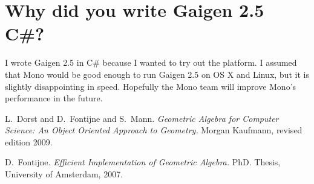 \documentclass[10pt, a4paper]{article}
\begin{document}
\section{Why did you write Gaigen 2.5 C\#?}

I wrote Gaigen 2.5 in C\# because I wanted to try out the platform.
I assumed that Mono would be good enough to run Gaigen 2.5 on OS X and
Linux, but it is slightly disappointing in speed. Hopefully the Mono
team will improve Mono's performance in the future.




\begin{thebibliography}{}


	
 L.~Dorst and D.~Fontijne and S.~Mann.
	\emph{Geometric Algebra for Computer Science: An Object Oriented Approach to Geometry.}
	Morgan Kaufmann, revised edition 2009.

 D.~Fontijne.
	\emph{Efficient Implementation of Geometric Algebra.}
	PhD. Thesis, University of Amsterdam, 2007.


\end{thebibliography}
\end{document}
